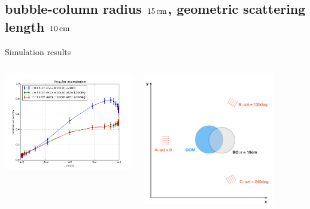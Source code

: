 \subsection{bubble-column radius $15\text{\,cm}$, geometric scattering length $10\text{\,cm}$}
\begin{frame}[fragile]{Simulation results}
  \begin{columns}
    \begin{column}{0.5\textwidth}
      \includegraphics[width=\textwidth]{img/summer_scenario_r15cm_esca10cm}
    \end{column}
    \begin{column}{0.5\textwidth}
      \includegraphics[width=0.8\textwidth]{img/summerscenario-004}
    \end{column}
  \end{columns}


\end{frame}
